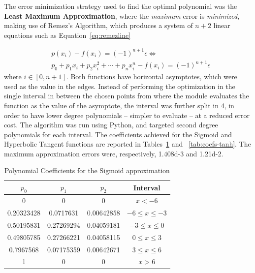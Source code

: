\documentclass{IEEEtran}
\begin{document}
The error minimization strategy used to find the optimal polynomial was the \textbf{Least Maximum Approximation}, where
the \emph{maximum} error is \emph{minimized}, making use of Remez's Algorithm, which produces a system of $n+2$ linear equations such as Equation~\ref{eq:remezline}

\begin{eqnarray}\label{eq:remezline}
    & p(x_i) - f(x_i) = (-1)^{n+1} \epsilon \Leftrightarrow  \nonumber \\
		& p_0 + p_1 x_i + p_2 x_i^2 + \cdots + p_n x_i^n - f(x_i) = (-1)^{n+1} \epsilon
\end{eqnarray}
where $i \in \left[0, n+1\right]$. Both functions have horizontal asymptotes, which were used as the value in the edges.
Instead of performing the optimization in the single interval in between the chosen points from where the module evaluates the function
as the value of the asymptote, the interval was further split in 4, in order to have lower degree polynomials -- simpler to evaluate -- at a reduced error cost.
The algorithm was run using Python, and targeted second degree polynomials for each interval. The coefficients achieved for the Sigmoid and Hyperbolic Tangent functions
are reported in Tables~\ref{tab:coefs-sigm} and ~\ref{tab:coefs-tanh}. The maximum approximation errors were, respectively, \num{1.408d-3} and \num{1.21d-2}.

\begin{table}
	\caption{Polynomial Coefficients for the Sigmoid approximation}
	\label{tab:coefs-sigm}
    \centering
  \begin{tabular}{ | c | c | c | c | }
    \hline
    $p_0$      &  $p_1$     &  $p_2$        &  Interval  \\
		\hline
    0          & 0          &  0             & $x < -6$ \\
    \hline
    0.20323428 & 0.0717631  & 0.00642858     & $-6 \leq x \leq -3$ \\
    \hline
		0.50195831 & 0.27269294 & 0.04059181     & $-3 \leq  x \leq 0$ \\
		\hline
		0.49805785 & 0.27266221 & 0.04058115     &  $0 \leq  x \leq 3$ \\
		\hline
		0.7967568 & 0.07175359 & 0.00642671      & $3 \leq  x \leq 6$ \\
		\hline
		1         &  0         &   0             & $x > 6$ \\
		\hline
  \end{tabular}
\end{table}
\end{document}
